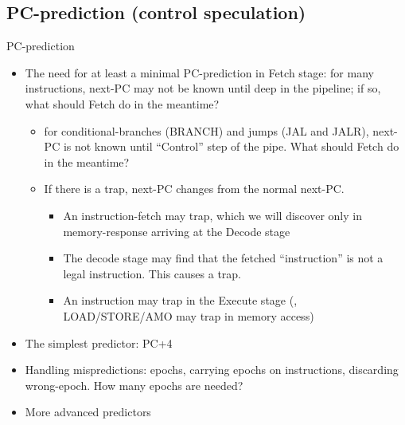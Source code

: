 
\subsection{PC-prediction (control speculation)}

PC-prediction
\begin{itemize}
  \item The need for at least a minimal PC-prediction in Fetch stage:
        for many instructions, next-PC may not be known until deep in
        the pipeline; if so, what should Fetch do in the meantime?

    \begin{itemize}

      \item for conditional-branches (BRANCH) and jumps (JAL and
            JALR), next-PC is not known until ``Control'' step of the
            pipe.  What should Fetch do in the meantime?

      \item If there is a trap, next-PC changes from the normal next-PC.

        \begin{itemize}

          \item An instruction-fetch may trap, which we will discover
                only in memory-response arriving at the Decode stage

          \item The decode stage may find that the fetched
                ``instruction'' is not a legal instruction.  This
                causes a trap.

          \item An instruction may trap in the Execute stage ({\eg},
                LOAD/STORE/AMO may trap in memory access)

        \end{itemize}
    \end{itemize}

  \item The simplest predictor: PC+4

  \item Handling mispredictions: epochs, carrying epochs on
        instructions, discarding wrong-epoch.  How many epochs are
        needed?

  \item More advanced predictors
\end{itemize}

